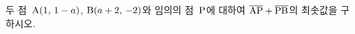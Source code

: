 두 점~$\mathrm{A}(1,\mkern3mu 1-a)$, $\mathrm{B}(a+2,\mkern3mu -2)$와 임의의 점~$\mathrm{P}$에 대하여 $\overline{\mathrm{AP}}+\overline{\mathrm{PB}}$의 최솟값을 구하시오.
